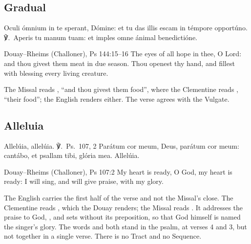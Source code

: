 \subsection{Gradual}
\label{proper-gradual}


\begin{latinproper}
Oculi ómnium in te sperant, Dómine: et tu das illis escam in témpore
opportúno. ℣.~Aperis tu manum tuam: et imples omne ánimal benedictióne.
\end{latinproper}

\begin{englishwitness}{Douay--Rheims (Challoner), Ps 144:15--16}
The eyes of all hope in thee, O Lord: and thou givest them meat in due season.
Thou openest thy hand, and fillest with blessing every living creature.
\end{englishwitness}

\noindent The Missal reads , ``and thou givest them
food'', where the Clementine reads , ``their
food''; the English renders either. The verse agrees with the Vulgate.

\subsection{Alleluia}
\label{proper-alleluia}


\begin{latinproper}
Allelúia, allelúia. ℣.~\textnormal{Ps.\ 107, 2} Parátum cor meum, Deus,
parátum cor meum: cantábo, et psallam tibi, glória mea. Allelúia.
\end{latinproper}

\begin{englishwitness}{Douay--Rheims (Challoner), Ps 107:2}
My heart is ready, O God, my heart is ready: I will sing, and will give praise,
with my glory.
\end{englishwitness}

\noindent The English carries the first half of the verse and not the Missal's
close. The Clementine reads , which
the Douay renders; the Missal reads . It addresses the praise to God, , and sets 
without its preposition, so that God himself is named the singer's glory. The
words  and  both stand in the psalm, at
verses 4 and 3, but not together in a single verse. There is no Tract and no
Sequence.

